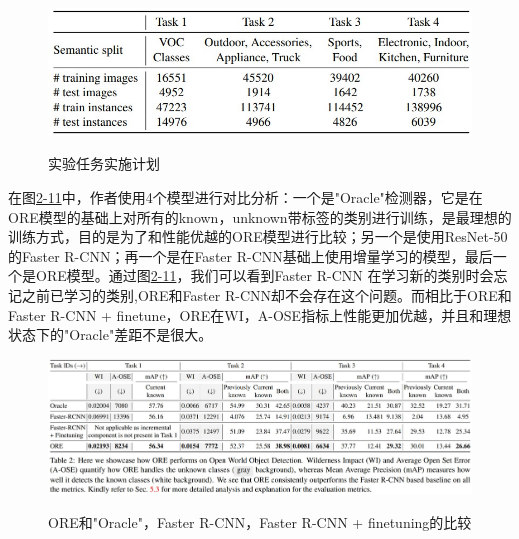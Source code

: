 \begin{figure}
  \centering
  \includegraphics[width=5in]{figure/example/ORE5.jpg}\\
  \caption{实验任务实施计划}\label{}
\end{figure}

在图\href{fig:2-11}{2-11}中，作者使用4个模型进行对比分析：一个是"Oracle"检测器，它是在ORE模型的基础上对所有的known，unknown带标签的类别进行训练，是最理想的训练方式，目的是为了和性能优越的ORE模型进行比较；另一个是使用ResNet-50 的Faster R-CNN；再一个是在Faster R-CNN基础上使用增量学习的模型，最后一个是ORE模型。通过图\href{fig:2-11}{2-11}，我们可以看到Faster R-CNN 在学习新的类别时会忘记之前已学习的类别,ORE和Faster R-CNN却不会存在这个问题。而相比于ORE和Faster R-CNN + finetune，ORE在WI，A-OSE指标上性能更加优越，并且和理想状态下的"Oracle"差距不是很大。

\begin{figure}
  \centering
  \includegraphics[width=6in]{figure/example/ORE6.jpg}\\
  \caption{ORE和"Oracle"，Faster R-CNN，Faster R-CNN + finetuning的比较}
  \label{}
\end{figure}

